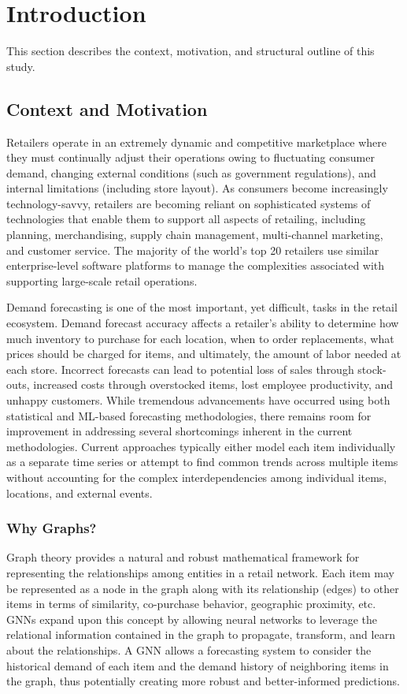 \chapter{Introduction} \label{chap:intro}

This section describes the context, motivation, and structural outline of this study.

\section{Context and Motivation} \label{sec:context_motivation}

Retailers operate in an extremely dynamic and competitive marketplace where they must continually adjust their operations owing to fluctuating consumer demand, changing external conditions (such as government regulations), and internal limitations (including store layout). As consumers become increasingly technology-savvy, retailers are becoming reliant on sophisticated systems of technologies that enable them to support all aspects of retailing, including planning, merchandising, supply chain management, multi-channel marketing, and customer service. The majority of the world’s top 20 retailers use similar enterprise-level software platforms to manage the complexities associated with supporting large-scale retail operations.

Demand forecasting is one of the most important, yet difficult, tasks in the retail ecosystem. Demand forecast accuracy affects a retailer’s ability to determine how much inventory to purchase for each location, when to order replacements, what prices should be charged for items, and ultimately, the amount of labor needed at each store. Incorrect forecasts can lead to potential loss of sales through stock-outs, increased costs through overstocked items, lost employee productivity, and unhappy customers. While tremendous advancements have occurred using both statistical and \ac{ML}-based forecasting methodologies, there remains room for improvement in addressing several shortcomings inherent in the current methodologies. Current approaches typically either model each item individually as a separate time series or attempt to find common trends across multiple items without accounting for the complex interdependencies among individual items, locations, and external events.

\subsection{Why Graphs?}
Graph theory provides a natural and robust mathematical framework for representing the relationships among entities in a retail network. Each item may be represented as a node in the graph along with its relationship (edges) to other items in terms of similarity, co-purchase behavior, geographic proximity, etc. \acp{GNN} expand upon this concept by allowing neural networks to leverage the relational information contained in the graph to propagate, transform, and learn about the relationships. A \ac{GNN} allows a forecasting system to consider the historical demand of each item and the demand history of neighboring items in the graph, thus potentially creating more robust and better-informed predictions.

